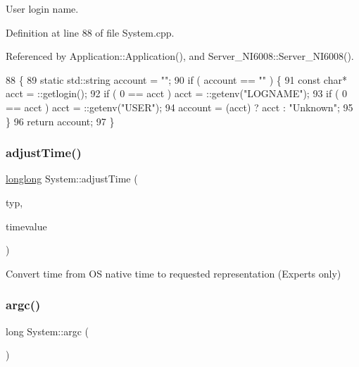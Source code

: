 User login name. 



Definition at line 88 of file System.\+cpp.



Referenced by Application\+::\+Application(), and Server\+\_\+\+N\+I6008\+::\+Server\+\_\+\+N\+I6008().


\begin{DoxyCode}
88                                      \{
89   \textcolor{keyword}{static} std::string account = \textcolor{stringliteral}{""};
90   \textcolor{keywordflow}{if} ( account == \textcolor{stringliteral}{""} ) \{
91     \textcolor{keyword}{const} \textcolor{keywordtype}{char}* acct = ::getlogin();
92     \textcolor{keywordflow}{if} ( 0 == acct ) acct = ::getenv(\textcolor{stringliteral}{"LOGNAME"});
93     \textcolor{keywordflow}{if} ( 0 == acct ) acct = ::getenv(\textcolor{stringliteral}{"USER"});
94     account = (acct) ? acct : \textcolor{stringliteral}{"Unknown"};
95   \}
96   \textcolor{keywordflow}{return} account;
97 \}
\end{DoxyCode}
\mbox{\label{namespaceSystem_a1013a898a3fc9cf6844b8af2c99f2396}} 
\subsubsection{\texorpdfstring{adjust\+Time()}{adjustTime()}}
{\footnotesize\ttfamily \hyperlink{Kernel_8h_a2e10ca87f14998150dd86073beff4e97}{longlong} System\+::adjust\+Time (\begin{DoxyParamCaption}\item[{\hyperlink{namespaceSystem_a15db094516c062b412df2453b4350f1a}{Time\+Type}}]{typ,  }\item[{\hyperlink{Kernel_8h_a2e10ca87f14998150dd86073beff4e97}{longlong}}]{timevalue }\end{DoxyParamCaption})}



Convert time from OS native time to requested representation (Experts only) 

\mbox{\label{namespaceSystem_aacf2e08c0661f343a44dc174a6931bc6}} 
\subsubsection{\texorpdfstring{argc()}{argc()}}
{\footnotesize\ttfamily long System\+::argc (\begin{DoxyParamCaption}{ }\end{DoxyParamCaption})}



